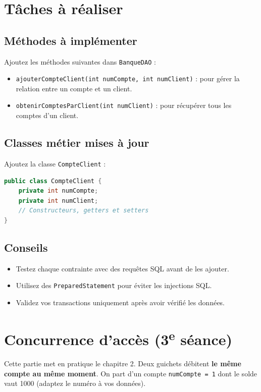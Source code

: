 \documentclass[11pt]{article}
\begin{document}
\section{Tâches à réaliser}
\subsection{Méthodes à implémenter}
Ajoutez les méthodes suivantes dans \texttt{BanqueDAO} :
\begin{itemize}
    \item \texttt{ajouterCompteClient(int numCompte, int numClient)} : pour gérer la relation entre un compte et un client.
    \item \texttt{obtenirComptesParClient(int numClient)} : pour récupérer tous les comptes d’un client.
\end{itemize}

\subsection{Classes métier mises à jour}
Ajoutez la classe \texttt{CompteClient} :
\begin{lstlisting}[language=Java]
public class CompteClient {
    private int numCompte;
    private int numClient;
    // Constructeurs, getters et setters
}
\end{lstlisting}


\subsection{Conseils}
\begin{itemize}
    \item Testez chaque contrainte avec des requêtes SQL avant de les ajouter.
    \item Utilisez des \texttt{PreparedStatement} pour éviter les injections SQL.
    \item Validez vos transactions uniquement après avoir vérifié les données.
\end{itemize}

\section{Concurrence d'accès (3\textsuperscript{e} séance)}

Cette partie met en pratique le chapitre 2. Deux guichets débitent \textbf{le même compte au même moment}.
On part d'un compte \texttt{numCompte = 1} dont le solde vaut 1000 (adaptez le numéro à vos données).
\end{document}
